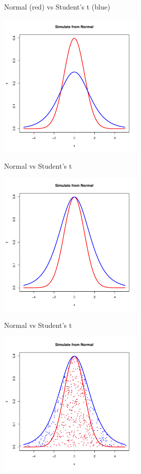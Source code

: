 \documentclass[10pt]{beamer}
\begin{document}
              \begin{frame}{Normal (red) vs Student's t (blue)}
                \begin{center}
                  \includegraphics[height=7cm]{./Pics/nmlg1.pdf}
                \end{center}
              \end{frame}

              \begin{frame}{Normal vs Student's t}
                \begin{center}
                  \includegraphics[height=7cm]{./Pics/nmlg2.pdf}
                \end{center}
              \end{frame}

              \begin{frame}{Normal vs Student's t}
                \begin{center}
                  \includegraphics[height=7cm]{./Pics/nmlg3.pdf}
                \end{center}
              \end{frame}
\end{document}
